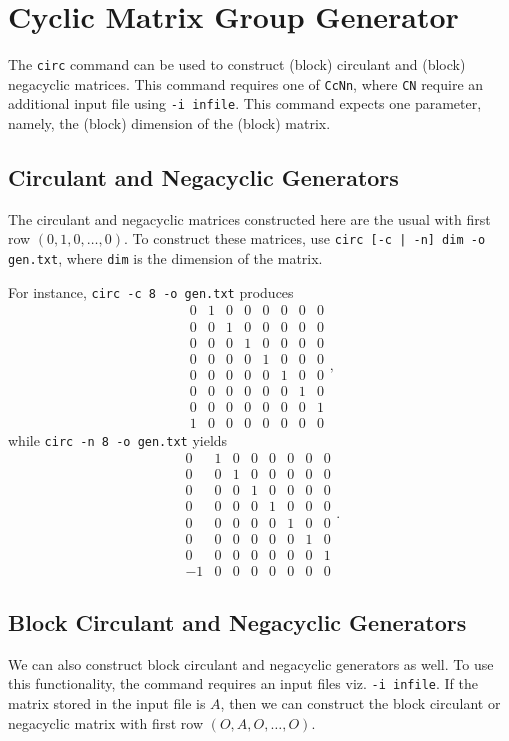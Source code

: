 \documentclass[a4paper,10pt]{article}
\begin{document}
\section{\centering\sc Cyclic Matrix Group Generator}
The {\tt circ} command can be used to construct (block) circulant and (block) negacyclic matrices. This command requires one of {\tt CcNn}, where {\tt CN} require an additional input file using {\tt -i infile}. This command expects one parameter, namely, the (block) dimension of the (block) matrix.

\subsection{\sc Circulant and Negacyclic Generators}
The circulant and negacyclic matrices constructed here are the usual with first row $(0,1,0,\dots,0)$. To construct these matrices, use {\tt circ [-c | -n] dim -o gen.txt}, where {\tt dim} is the dimension of the matrix. 

For instance, {\tt circ -c 8 -o gen.txt} produces
\[
 \begin{array}{rrrrrrrr}
0 & 1 & 0 & 0 & 0 & 0 & 0 & 0 \\
0 & 0 & 1 & 0 & 0 & 0 & 0 & 0 \\
0 & 0 & 0 & 1 & 0 & 0 & 0 & 0 \\
0 & 0 & 0 & 0 & 1 & 0 & 0 & 0 \\
0 & 0 & 0 & 0 & 0 & 1 & 0 & 0 \\
0 & 0 & 0 & 0 & 0 & 0 & 1 & 0 \\
0 & 0 & 0 & 0 & 0 & 0 & 0 & 1 \\
1 & 0 & 0 & 0 & 0 & 0 & 0 & 0
\end{array},
\]
while {\tt circ -n 8 -o gen.txt} yields
\[
 \begin{array}{rrrrrrrr}
0 & 1 & 0 & 0 & 0 & 0 & 0 & 0 \\
0 & 0 & 1 & 0 & 0 & 0 & 0 & 0 \\
0 & 0 & 0 & 1 & 0 & 0 & 0 & 0 \\
0 & 0 & 0 & 0 & 1 & 0 & 0 & 0 \\
0 & 0 & 0 & 0 & 0 & 1 & 0 & 0 \\
0 & 0 & 0 & 0 & 0 & 0 & 1 & 0 \\
0 & 0 & 0 & 0 & 0 & 0 & 0 & 1 \\
-1 & 0 & 0 & 0 & 0 & 0 & 0 & 0
\end{array}.
\]

\subsection{\sc Block Circulant and Negacyclic Generators}
We can also construct block circulant and negacyclic generators as well. To use this functionality, the command requires an input files viz. {\tt -i infile}. If the matrix stored in the input file is $A$, then we can construct the block circulant or negacyclic matrix with first row $(O,A,O,\dots,O)$.
\end{document}
